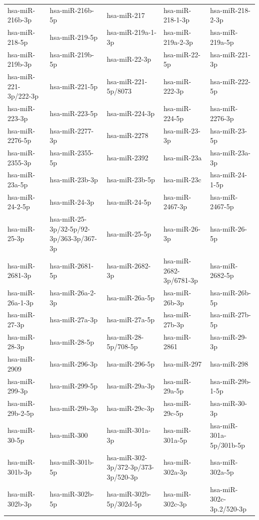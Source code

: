 \begin{longtable}{lllll}
hsa-miR-216b-3p & hsa-miR-216b-5p & hsa-miR-217 & hsa-miR-218-1-3p & hsa-miR-218-2-3p \\
hsa-miR-218-5p & hsa-miR-219-5p & hsa-miR-219a-1-3p & hsa-miR-219a-2-3p & hsa-miR-219a-5p \\
hsa-miR-219b-3p & hsa-miR-219b-5p & hsa-miR-22-3p & hsa-miR-22-5p & hsa-miR-221-3p \\
hsa-miR-221-3p/222-3p & hsa-miR-221-5p & hsa-miR-221-5p/8073 & hsa-miR-222-3p & hsa-miR-222-5p \\
hsa-miR-223-3p & hsa-miR-223-5p & hsa-miR-224-3p & hsa-miR-224-5p & hsa-miR-2276-3p \\
hsa-miR-2276-5p & hsa-miR-2277-3p & hsa-miR-2278 & hsa-miR-23-3p & hsa-miR-23-5p \\
hsa-miR-2355-3p & hsa-miR-2355-5p & hsa-miR-2392 & hsa-miR-23a & hsa-miR-23a-3p \\
hsa-miR-23a-5p & hsa-miR-23b-3p & hsa-miR-23b-5p & hsa-miR-23c & hsa-miR-24-1-5p \\
hsa-miR-24-2-5p & hsa-miR-24-3p & hsa-miR-24-5p & hsa-miR-2467-3p & hsa-miR-2467-5p \\
hsa-miR-25-3p & hsa-miR-25-3p/32-5p/92-3p/363-3p/367-3p & hsa-miR-25-5p & hsa-miR-26-3p & hsa-miR-26-5p \\
hsa-miR-2681-3p & hsa-miR-2681-5p & hsa-miR-2682-3p & hsa-miR-2682-3p/6781-3p & hsa-miR-2682-5p \\
hsa-miR-26a-1-3p & hsa-miR-26a-2-3p & hsa-miR-26a-5p & hsa-miR-26b-3p & hsa-miR-26b-5p \\
hsa-miR-27-3p & hsa-miR-27a-3p & hsa-miR-27a-5p & hsa-miR-27b-3p & hsa-miR-27b-5p \\
hsa-miR-28-3p & hsa-miR-28-5p & hsa-miR-28-5p/708-5p & hsa-miR-2861 & hsa-miR-29-3p \\
hsa-miR-2909 & hsa-miR-296-3p & hsa-miR-296-5p & hsa-miR-297 & hsa-miR-298 \\
hsa-miR-299-3p & hsa-miR-299-5p & hsa-miR-29a-3p & hsa-miR-29a-5p & hsa-miR-29b-1-5p \\
hsa-miR-29b-2-5p & hsa-miR-29b-3p & hsa-miR-29c-3p & hsa-miR-29c-5p & hsa-miR-30-3p \\
hsa-miR-30-5p & hsa-miR-300 & hsa-miR-301a-3p & hsa-miR-301a-5p & hsa-miR-301a-5p/301b-5p \\
hsa-miR-301b-3p & hsa-miR-301b-5p & hsa-miR-302-3p/372-3p/373-3p/520-3p & hsa-miR-302a-3p & hsa-miR-302a-5p \\
hsa-miR-302b-3p & hsa-miR-302b-5p & hsa-miR-302b-5p/302d-5p & hsa-miR-302c-3p & hsa-miR-302c-3p.2/520-3p \\

\end{longtable}
